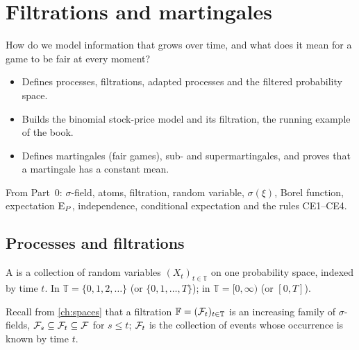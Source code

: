 \chapter{Filtrations and martingales}
\label{ch:martingales}

\begin{question}
How do we model information that grows over time, and what does it mean for a game to be fair at every moment?
\end{question}

\begin{whatfor}
\begin{itemize}
  \item Defines processes, filtrations, adapted processes and the filtered probability space.
  \item Builds the binomial stock-price model and its filtration, the running example of the book.
  \item Defines martingales (fair games), sub- and supermartingales, and proves that a martingale has a constant mean.
\end{itemize}
\end{whatfor}

\begin{prereq}
From Part~0: $\sigma$-field, atoms, filtration, random variable, $\sigma(\xi)$, Borel function, expectation $\operatorname{E}_P$, independence, conditional expectation and the rules CE1--CE4.
\end{prereq}

\section{Processes and filtrations}

\begin{definition}
\label{def:process}
A  is a collection of random variables $(X_t)_{t\in\mathbb T}$ on one probability space, indexed by time $t$. In  $\mathbb T=\{0,1,2,\dots\}$ (or $\{0,1,\dots,T\}$); in  $\mathbb T=[0,\infty)$ (or $[0,T]$).
\end{definition}

Recall from \cref{ch:spaces} that a filtration $\mathbb F=(\mathcal F_t)_{t\in\mathbb T}$ is an increasing family of $\sigma$-fields, $\mathcal F_s\subseteq\mathcal F_t\subseteq\mathcal F$ for $s\le t$; $\mathcal F_t$ is the collection of events whose occurrence is known by time $t$.

